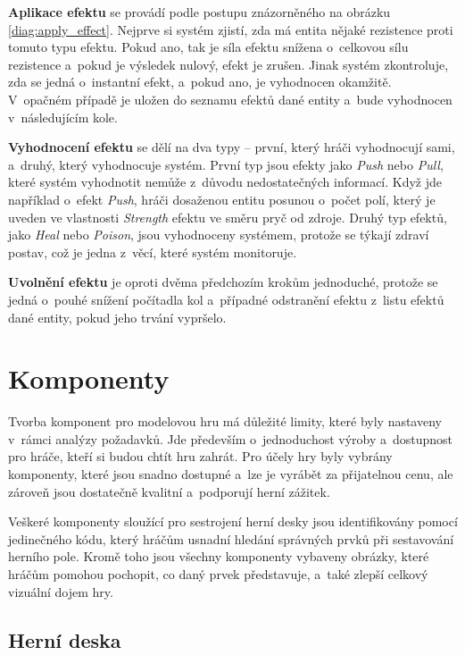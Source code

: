 \textbf{Aplikace efektu} se provádí podle postupu znázorněného na obrázku \ref{diag:apply_effect}. Nejprve si systém zjistí, zda má entita nějaké rezistence proti tomuto typu efektu. Pokud ano, tak je síla efektu snížena o~celkovou sílu rezistence a~pokud je výsledek nulový, efekt je zrušen. Jinak systém zkontroluje, zda se jedná o~instantní efekt, a~pokud ano, je vyhodnocen okamžitě. V~opačném případě je uložen do seznamu efektů dané entity a~bude vyhodnocen v~následujícím kole.

\textbf{Vyhodnocení efektu} se dělí na dva typy -- první, který hráči vyhodnocují sami, a~druhý, který vyhodnocuje systém. První typ jsou efekty jako \textit{Push} nebo \textit{Pull}, které systém vyhodnotit nemůže z~důvodu nedostatečných informací. Když jde například o~efekt \textit{Push}, hráči dosaženou entitu posunou o~počet polí, který je uveden ve vlastnosti \textit{Strength} efektu ve směru pryč od zdroje. Druhý typ efektů, jako \textit{Heal} nebo \textit{Poison}, jsou vyhodnoceny systémem, protože se týkají zdraví postav, což je jedna z~věcí, které systém monitoruje.

\textbf{Uvolnění efektu} je oproti dvěma předchozím krokům jednoduché, protože se jedná o~pouhé snížení počítadla kol a~případné odstranění efektu z~listu efektů dané entity, pokud jeho trvání vypršelo.


\section{Komponenty}
\label{sec:design_components}

Tvorba komponent pro modelovou hru má důležité limity, které byly nastaveny v~rámci analýzy požadavků. Jde především o~jednoduchost výroby a~dostupnost pro hráče, kteří si budou chtít hru zahrát. Pro účely hry byly vybrány komponenty, které jsou snadno dostupné a~lze je vyrábět za přijatelnou cenu, ale zároveň jsou dostatečně kvalitní a~podporují herní zážitek.

Veškeré komponenty sloužící pro sestrojení herní desky jsou identifikovány pomocí jedinečného kódu, který hráčům usnadní hledání správných prvků při sestavování herního pole. Kromě toho jsou všechny komponenty vybaveny obrázky, které hráčům pomohou pochopit, co daný prvek představuje, a~také zlepší celkový vizuální dojem hry.

\subsection{Herní deska}
\label{subsec:design_board}

